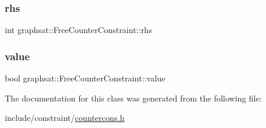 \subsubsection{\texorpdfstring{rhs}{rhs}}
{\footnotesize\ttfamily int graphsat\+::\+Free\+Counter\+Constraint\+::rhs\hspace{0.3cm}{\ttfamily [private]}}

\mbox{\label{classgraphsat_1_1_free_counter_constraint_a3c357f4c9f5b8c8b962ab76034d8c0c6}} 
\subsubsection{\texorpdfstring{value}{value}}
{\footnotesize\ttfamily bool graphsat\+::\+Free\+Counter\+Constraint\+::value\hspace{0.3cm}{\ttfamily [private]}}



The documentation for this class was generated from the following file\+:\begin{DoxyCompactItemize}
\item 
include/constraint/\mbox{\hyperlink{countercons_8h}{countercons.\+h}}\end{DoxyCompactItemize}
